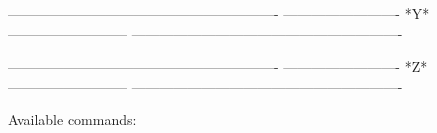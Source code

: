  
 
----------------------------------------------------------
-------------------------  *Y*  --------------------------
----------------------------------------------------------
 
 
 
 
 
 
 
 
 
 
 
 
 
 
 
 
 
 
 
 
 
 
 
 
 
 
 
 
 
 
 
 
 
 
 
 
 
 
 
 
 
 
 
 
 
 
 
 
 
 
 
 
 
 
 
 
 
 
 
 
 
 
 
 
 
 
 
 
 
 
 
 
 
 
 
 
 
 
 
 
 
 
 
 
 
 
 
 
 
 
 
 
 
 
 
 
 
----------------------------------------------------------
-------------------------  *Z*  --------------------------
----------------------------------------------------------
 
   Available commands:
 
